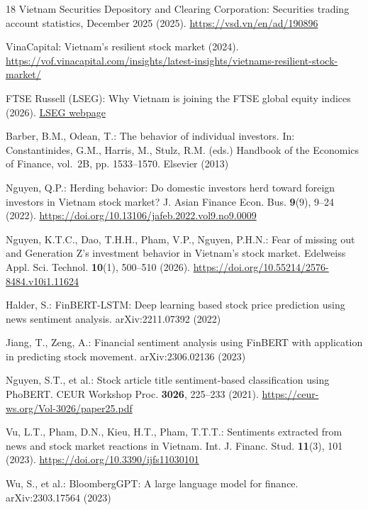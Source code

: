 \documentclass[runningheads]{llncs}
\begin{document}
\begin{thebibliography}{18}
Vietnam Securities Depository and Clearing Corporation: Securities trading account
statistics, December 2025 (2025). \url{https://vsd.vn/en/ad/190896}

VinaCapital: Vietnam's resilient stock market (2024).
\url{https://vof.vinacapital.com/insights/latest-insights/vietnams-resilient-stock-market/}

FTSE Russell (LSEG): Why Vietnam is joining the FTSE global equity indices (2026).
\href{https://www.lseg.com/en/insights/ftse-russell/why-vietnam-is-joining-the-ftse-geis}{LSEG webpage}

Barber, B.M., Odean, T.: The behavior of individual investors. In: Constantinides,
G.M., Harris, M., Stulz, R.M. (eds.) Handbook of the Economics of Finance,
vol.~2B, pp. 1533--1570. Elsevier (2013)

Nguyen, Q.P.: Herding behavior: Do domestic investors herd toward foreign
investors in Vietnam stock market? J. Asian Finance Econ. Bus. \textbf{9}(9),
9--24 (2022). \url{https://doi.org/10.13106/jafeb.2022.vol9.no9.0009}

Nguyen, K.T.C., Dao, T.H.H., Pham, V.P., Nguyen, P.H.N.: Fear of missing out and
Generation Z's investment behavior in Vietnam's stock market. Edelweiss Appl. Sci.
Technol. \textbf{10}(1), 500--510 (2026).
\url{https://doi.org/10.55214/2576-8484.v10i1.11624}

Halder, S.: FinBERT-LSTM: Deep learning based stock price prediction using news
sentiment analysis. arXiv:2211.07392 (2022)

Jiang, T., Zeng, A.: Financial sentiment analysis using FinBERT with application
in predicting stock movement. arXiv:2306.02136 (2023)

Nguyen, S.T., et al.: Stock article title sentiment-based classification using
PhoBERT. CEUR Workshop Proc. \textbf{3026}, 225--233 (2021).
\url{https://ceur-ws.org/Vol-3026/paper25.pdf}

Vu, L.T., Pham, D.N., Kieu, H.T., Pham, T.T.T.: Sentiments extracted from news and
stock market reactions in Vietnam. Int. J. Financ. Stud. \textbf{11}(3), 101
(2023). \url{https://doi.org/10.3390/ijfs11030101}

Wu, S., et al.: BloombergGPT: A large language model for finance.
arXiv:2303.17564 (2023)


\end{thebibliography}
\end{document}
